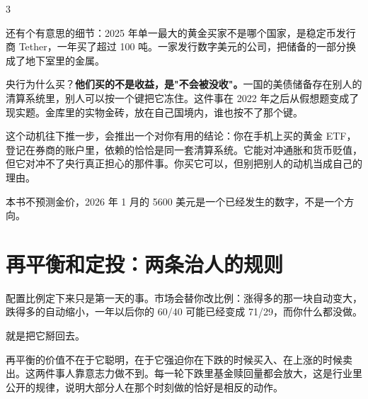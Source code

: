 \begin{statrow}{3}
\end{statrow}

还有个有意思的细节：2025 年单一最大的黄金买家不是哪个国家，是稳定币发行商 Tether，一年买了超过 100 吨。一家发行数字美元的公司，把储备的一部分换成了地下室里的金属。

央行为什么买？\textbf{他们买的不是收益，是"不会被没收"。}一国的美债储备存在别人的清算系统里，别人可以按一个键把它冻住。这件事在 2022 年之后从假想题变成了现实题。金库里的实物金砖，放在自己国境内，谁也按不了那个键。

这个动机往下推一步，会推出一个对你有用的结论：你在手机上买的黄金 ETF，登记在券商的账户里，依赖的恰恰是同一套清算系统。它能对冲通胀和货币贬值，但它对冲不了央行真正担心的那件事。你买它可以，但别把别人的动机当成自己的理由。

本书不预测金价，2026 年 1 月的 5600 美元是一个已经发生的数字，不是一个方向。

\section{再平衡和定投：两条治人的规则}

配置比例定下来只是第一天的事。市场会替你改比例：涨得多的那一块自动变大，跌得多的自动缩小，一年以后你的 60/40 可能已经变成 71/29，而你什么都没做。

就是把它掰回去。

\begin{flowlist}
\end{flowlist}

再平衡的价值不在于它聪明，在于它强迫你在下跌的时候买入、在上涨的时候卖出。这两件事人靠意志力做不到。每一轮下跌里基金赎回量都会放大，这是行业里公开的规律，说明大部分人在那个时刻做的恰好是相反的动作。

